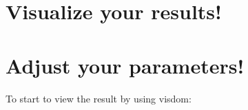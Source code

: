 \documentclass[letterpaper,10pt,english]{sphinxmanual}
\begin{document}
\begin{fulllineitems}
\label{\detokenize{usage/train:train_unet.fill_image}}
\end{fulllineitems}


\begin{fulllineitems}
\label{\detokenize{usage/train:train_unet.main}}
\end{fulllineitems}


\begin{fulllineitems}
\label{\detokenize{usage/train:train_unet.preprocess}}
\end{fulllineitems}


\begin{fulllineitems}
\label{\detokenize{usage/train:train_unet.random}}\pysiglinewithargsret{\sphinxcode{\sphinxupquote{train\_unet.}}\sphinxbfcode{\sphinxupquote{random}}}{}{{ $\rightarrow$ x in the interval {[}0, 1).}}
\end{fulllineitems}



\chapter{Visualize your results!}
\label{\detokenize{usage/view:visualize-your-results}}\label{\detokenize{usage/view::doc}}

\chapter{Adjust your parameters!}
\label{\detokenize{usage/adjust:adjust-your-parameters}}\label{\detokenize{usage/adjust::doc}}
To start to view the result by using visdom:
\end{document}
